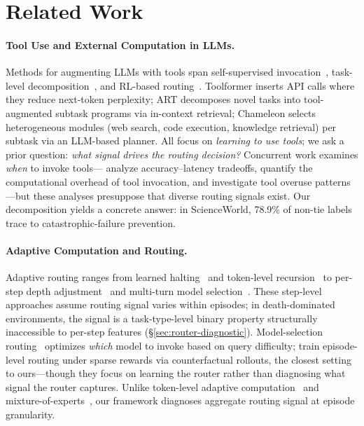 \section{Related Work}

\paragraph{Tool Use and External Computation in LLMs.}
Methods for augmenting LLMs with tools span self-supervised invocation~\citep{toolformer-2023,toolace-2025}, task-level decomposition~\citep{art-2023,chameleon-2023}, and RL-based routing~\citep{retool-2025,tool-learning-survey-2024}. Toolformer inserts API calls where they reduce next-token perplexity; ART decomposes novel tasks into tool-augmented subtask programs via in-context retrieval; Chameleon selects heterogeneous modules (web search, code execution, knowledge retrieval) per subtask via an LLM-based planner. All focus on \emph{learning to use tools}; we ask a prior question: \emph{what signal drives the routing decision?} Concurrent work examines \emph{when} to invoke tools---\citet{when2tool-2026} analyze accuracy--latency tradeoffs, \citet{tool-use-tax-2026} quantify the computational overhead of tool invocation, and \citet{to-call-or-not-2026,tool-overuse-illusion-2026} investigate tool overuse patterns---but these analyses presuppose that diverse routing signals exist. Our decomposition yields a concrete answer: in ScienceWorld, 78.9\% of non-tie labels trace to catastrophic-failure prevention.

\paragraph{Adaptive Computation and Routing.}
Adaptive routing ranges from learned halting~\citep{graves2016act} and token-level recursion~\citep{mixture-of-recursions-2025} to per-step depth adjustment~\citep{cogrouter-2026,ares-2026} and multi-turn model selection~\citep{mtrouter-2026}. These step-level approaches assume routing signal varies within episodes; in death-dominated environments, the signal is a task-type-level binary property structurally inaccessible to per-step features (\S\ref{sec:router-diagnostic}). Model-selection routing~\citep{routellm-2024,frugalgpt-2023,automix-2024} optimizes \emph{which} model to invoke based on query difficulty; \citet{budget-aware-routing-2026} train episode-level routing under sparse rewards via counterfactual rollouts, the closest setting to ours---though they focus on learning the router rather than diagnosing what signal the router captures. Unlike token-level adaptive computation~\citep{mixture-of-depths-2024,xin2020deebert} and mixture-of-experts~\citep{switch-transformer-2022}, our framework diagnoses aggregate routing signal at episode granularity.

